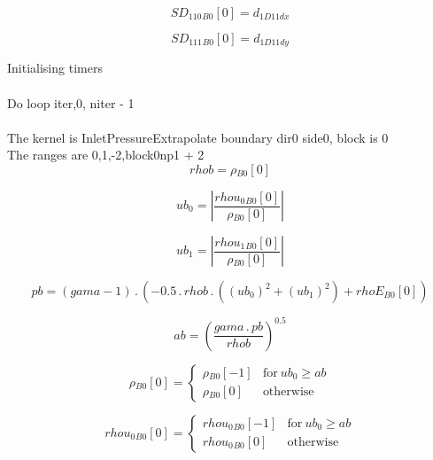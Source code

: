\documentclass{article}
\begin{document}
\begin{dmath}{SD_{110}{_{B0}}}[{0}] = d_{1 D11 dx}\end{dmath}

\begin{dmath}{SD_{111}{_{B0}}}[{0}] = d_{1 D11 dy}\end{dmath}

\noindent Initialising timers\\
\\\noindent Do loop iter,0, niter - 1\\
\\\noindent The kernel is InletPressureExtrapolate boundary dir0 side0, block is 0\\\noindent The ranges are 0,1,-2,block0np1 + 2\\\begin{dmath}rhob = {\rho{_{B0}}}[{0}]\end{dmath}

\begin{dmath}ub_{0} = \left|{\frac{{rhou_{0}{_{B0}}}[{0}]}{{\rho{_{B0}}}[{0}]}}\right|\end{dmath}

\begin{dmath}ub_{1} = \left|{\frac{{rhou_{1}{_{B0}}}[{0}]}{{\rho{_{B0}}}[{0}]}}\right|\end{dmath}

\begin{dmath}pb = \left(gama - 1\right) \,.\, \left(- 0.5 \,.\, rhob \,.\, \left(\left(ub_{0} \right)^{2} + \left(ub_{1} \right)^{2}\right) + {rhoE{_{B0}}}[{0}]\right)\end{dmath}

\begin{dmath}ab = \left(\frac{gama \,.\, pb}{rhob} \right)^{0.5}\end{dmath}

\begin{dmath}{\rho{_{B0}}}[{0}] = \begin{cases} {\rho{_{B0}}}[{-1}] & \text{for}\: ub_{0} \geq ab \\{\rho{_{B0}}}[{0}] & \text{otherwise} \end{cases}\end{dmath}

\begin{dmath}{rhou_{0}{_{B0}}}[{0}] = \begin{cases} {rhou_{0}{_{B0}}}[{-1}] & \text{for}\: ub_{0} \geq ab \\{rhou_{0}{_{B0}}}[{0}] & \text{otherwise} \end{cases}\end{dmath}
\end{document}
